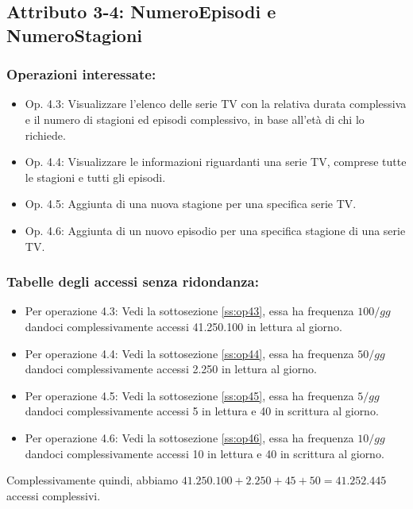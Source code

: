 \documentclass[a4paper,12pt]{report}
\begin{document}
\subsection{Attributo 3-4: NumeroEpisodi e NumeroStagioni}
\subsubsection{Operazioni interessate:}
\begin{itemize}
	\item Op. 4.3: Visualizzare l’elenco delle serie TV con la relativa durata complessiva e il numero di stagioni ed episodi complessivo, in base all’età di chi lo richiede.
	\item Op. 4.4: Visualizzare le informazioni riguardanti una serie TV, comprese tutte le stagioni e tutti gli episodi.
	\item Op. 4.5: Aggiunta di una nuova stagione per una specifica serie TV.
	\item Op. 4.6: Aggiunta di un nuovo episodio per una specifica stagione di una serie TV.
\end{itemize}
\subsubsection{Tabelle degli accessi senza ridondanza:}
\begin{itemize}
	\item Per operazione 4.3: Vedi la sottosezione \ref{ss:op43}, essa ha frequenza $100/gg$ dandoci complessivamente accessi 41.250.100 in lettura al giorno.
	\item Per operazione 4.4: Vedi la sottosezione \ref{ss:op44}, essa ha frequenza $50/gg$ dandoci complessivamente accessi 2.250 in lettura al giorno.
	\item Per operazione 4.5: Vedi la sottosezione \ref{ss:op45}, essa ha frequenza $5/gg$ dandoci complessivamente accessi 5 in lettura e 40 in scrittura al giorno.
	\item Per operazione 4.6: Vedi la sottosezione \ref{ss:op46}, essa ha frequenza $10/gg$ dandoci complessivamente accessi 10 in lettura e 40 in scrittura al giorno.
\end{itemize}
Complessivamente quindi, abbiamo $41.250.100 + 2.250 + 45 + 50 = 41.252.445$ accessi complessivi.
\end{document}
